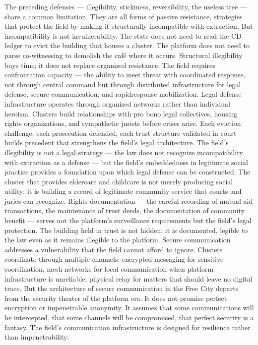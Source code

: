 The preceding defenses — illegibility, stickiness, reversibility, the useless tree — share a common limitation. They are all forms of passive resistance, strategies that protect the field by making it structurally incompatible with extraction. But incompatibility is not invulnerability. The state does not need to read the CD ledger to evict the building that houses a cluster. The platform does not need to parse co-witnessing to demolish the café where it occurs. Structural illegibility buys time; it does not replace organized resistance. The field requires confrontation capacity — the ability to meet threat with coordinated response, not through central command but through distributed infrastructure for legal defense, secure communication, and rapidresponse mobilization. Legal defense infrastructure operates through organized networks rather than individual heroism. Clusters build relationships with pro bono legal collectives, housing rights organizations, and sympathetic jurists before crises arise. Each eviction challenge, each prosecution defended, each trust structure validated in court builds precedent that strengthens the field’s legal architecture. The field’s illegibility is not a legal strategy — the law does not recognize incompatibility with extraction as a defense — but the field’s embeddedness in legitimate social practice provides a foundation upon which legal defense can be constructed. The cluster that provides eldercare and childcare is not merely producing social utility; it is building a record of legitimate community service that courts and juries can recognize. Rights documentation — the careful recording of mutual aid transactions, the maintenance of trust deeds, the documentation of community benefit — serves not the platform’s surveillance requirements but the field’s legal protection. The building held in trust is not hidden; it is documented, legible to the law even as it remains illegible to the platform. Secure communication addresses a vulnerability that the field cannot afford to ignore. Clusters coordinate through multiple channels: encrypted messaging for sensitive coordination, mesh networks for local communication when platform infrastructure is unreliable, physical relay for matters that should leave no digital trace. But the architecture of secure communication in the Free City departs from the security theater of the platform era. It does not promise perfect encryption or impenetrable anonymity. It assumes that some communications will be intercepted, that some channels will be compromised, that perfect security is a fantasy. The field’s communication infrastructure is designed for resilience rather than impenetrability:

